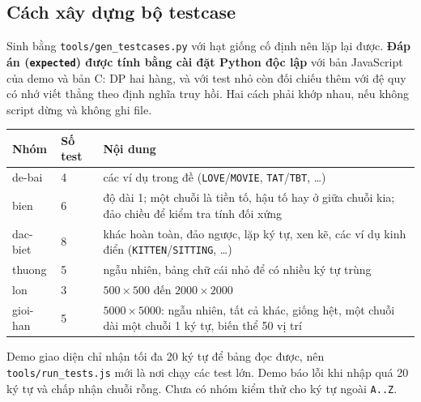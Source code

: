 \documentclass[12pt,a4paper]{article}
\newcommand{\code}[1]{\texttt{#1}}
\begin{document}
\subsection{Cách xây dựng bộ testcase}
Sinh bằng \code{tools/gen\_testcases.py} với hạt giống cố định nên lặp lại được. \textbf{Đáp án (\code{expected}) được tính bằng cài đặt Python độc lập} với bản JavaScript của demo và bản C: DP hai hàng, và với test nhỏ còn đối chiếu thêm với đệ quy có nhớ viết thẳng theo định nghĩa truy hồi. Hai cách phải khớp nhau, nếu không script dừng và không ghi file.

\begin{center}
\begin{tabular}{@{}llp{7.2cm}@{}}
\toprule
\textbf{Nhóm} & \textbf{Số test} & \textbf{Nội dung}\\
\midrule
de-bai & 4 & các ví dụ trong đề (\code{LOVE}/\code{MOVIE}, \code{TAT}/\code{TBT}, \dots)\\
bien & 6 & độ dài 1; một chuỗi là tiền tố, hậu tố hay ở giữa chuỗi kia; đảo chiều để kiểm tra tính đối xứng\\
dac-biet & 8 & khác hoàn toàn, đảo ngược, lặp ký tự, xen kẽ, các ví dụ kinh điển (\code{KITTEN}/\code{SITTING}, \dots)\\
thuong & 5 & ngẫu nhiên, bảng chữ cái nhỏ để có nhiều ký tự trùng\\
lon & 3 & $500\times500$ đến $2000\times2000$\\
gioi-han & 5 & $5000\times5000$: ngẫu nhiên, tất cả khác, giống hệt, một chuỗi dài một chuỗi 1 ký tự, biến thể 50 vị trí\\
\bottomrule
\end{tabular}
\end{center}
Demo giao diện chỉ nhận tối đa 20 ký tự để bảng đọc được, nên \code{tools/run\_tests.js} mới là nơi chạy các test lớn. Demo báo lỗi khi nhập quá 20 ký tự và chấp nhận chuỗi rỗng. Chưa có nhóm kiểm thử cho ký tự ngoài \code{A..Z}.
\end{document}
